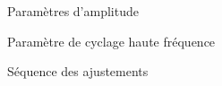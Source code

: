 \documentclass[aspectratio=169]{beamer}
\begin{document}
\begin{frame}{Paramètres d'amplitude}
	
\end{frame}

\begin{frame}[c]{Paramètre de cyclage haute fréquence}
	\centering
	\tikzset{external/remake next}
	
\end{frame}

\begin{frame}[c]{Séquence des ajustements}
	\centering
	
\end{frame}
\end{document}
